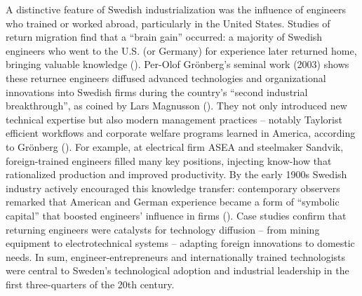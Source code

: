 \documentclass[
]{article}
\begin{document}
A distinctive feature of Swedish industrialization was the influence of
engineers who trained or worked abroad, particularly in the United
States. Studies of return migration find that a ``brain gain'' occurred:
a majority of Swedish engineers who went to the U.S. (or Germany) for
experience later returned home, bringing valuable knowledge\hspace{0pt}
().
Per-Olof Grönberg's seminal work (2003) shows these returnee engineers
diffused advanced technologies and organizational innovations into
Swedish firms during the country's ``second industrial
breakthrough''\hspace{0pt}, as coined by Lars Magnusson
(). They not
only introduced new technical expertise but also modern management
practices -- notably Taylorist efficient workflows and corporate welfare
programs learned in America\hspace{0pt}, according to Grönberg
(). For example,
at electrical firm ASEA and steelmaker Sandvik, foreign-trained
engineers filled many key positions, injecting know-how that
rationalized production and improved productivity\hspace{0pt}.
\hspace{0pt} By the early 1900s Swedish industry actively encouraged
this knowledge transfer: contemporary observers remarked that American
and German experience became a form of ``symbolic capital'' that boosted
engineers' influence in firms\hspace{0pt}
().
Case studies confirm that returning engineers were catalysts for
technology diffusion -- from mining equipment to electrotechnical
systems -- adapting foreign innovations to domestic needs\hspace{0pt}.
In sum, engineer-entrepreneurs and internationally trained technologists
were central to Sweden's technological adoption and industrial
leadership in the first three-quarters of the 20th century.
\end{document}

